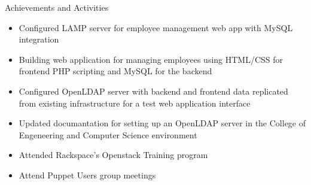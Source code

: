 \documentclass[11pt,oneside]{article}
\newenvironment{ressection}[1]{
	\vspace{4pt}
	{\fontfamily{phv}\selectfont\Large#1}
	\begin{itemize}
	\vspace{3pt}
}{
	\end{itemize}
}
\newcommand{\resitem}[1]{
	\vspace{-4pt}
	\item \begin{flushleft} #1 \end{flushleft}
}
\begin{document}
\begin{ressection}{Achievements and Activities}
    \resitem{Configured LAMP server for employee management web app with MySQL integration}
    \resitem{Building web application for managing employees using HTML/CSS for frontend PHP scripting and MySQL for the backend}
    \resitem{Configured OpenLDAP server with backend and frontend data replicated from existing infrastructure for a test web application interface}
    \resitem{Updated documantation for setting up an OpenLDAP server in the College of Engeneering and Computer Science environment}
    \resitem{Attended Rackspace's Openstack Training program}
    \resitem{Attend Puppet Users group meetings}
\end{ressection}
\end{document}

